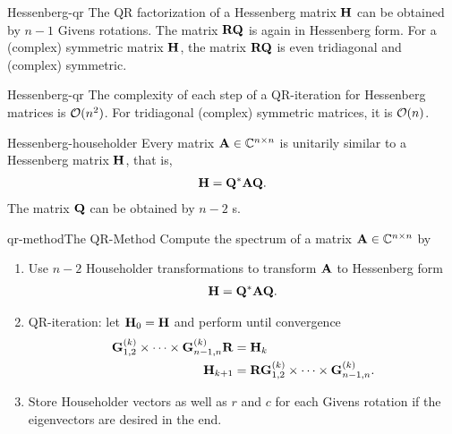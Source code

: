 \begin{Theorem}{Hessenberg-qr}
  The QR factorization of a Hessenberg matrix $\mathbf H$ can be obtained
  by $n-1$ Givens rotations. The matrix $\mathbf R\mathbf Q$ is again in
  Hessenberg form. For a (complex) symmetric matrix $\mathbf H$, the
  matrix $\mathbf R\mathbf Q$ is even tridiagonal and (complex) symmetric.
\end{Theorem}

\begin{Corollary}{Hessenberg-qr}
  The complexity of each step of a QR-iteration for Hessenberg matrices is $\mathcal O(n^2)$. For tridiagonal (complex) symmetric matrices, it is $\mathcal O(n)$.
\end{Corollary}

\begin{Theorem}{Hessenberg-householder}
  Every matrix $\mathbf A\in\mathbb C^{n\times n}$ is unitarily similar to a Hessenberg matrix $\mathbf H$, that is,
  \begin{gather}
    \mathbf H = \mathbf Q^* \mathbf A \mathbf Q.
  \end{gather}
  The matrix $\mathbf Q$ can be obtained by $n-2$ s.
\end{Theorem}

\begin{Algorithm*}{qr-method}{The QR-Method}
  Compute the spectrum of a matrix $\mathbf A\in\mathbb C^{n\times n}$ by
  \begin{enumerate}
  \item Use $n-2$ Householder transformations to transform $\mathbf A$ to
    Hessenberg form
    \begin{gather}
     \mathbf H = \mathbf Q^*\mathbf A\mathbf Q.
   \end{gather}
 \item QR-iteration: let $\mathbf H_{0}=\mathbf H$ and perform until convergence
   \begin{align}
     \mathbf G^{(k)}_{1,2}\times\dots\times\mathbf G^{(k)}_{n-1,n} \mathbf R &= \mathbf H_k\\
     \mathbf H_{k+1} &= \mathbf R \mathbf G^{(k)}_{1,2}\times\dots\times\mathbf G^{(k)}_{n-1,n}.
   \end{align}
 \item Store Householder vectors as well as $r$ and $c$ for each
   Givens rotation if the eigenvectors are desired in the end.
  \end{enumerate}
\end{Algorithm*}

